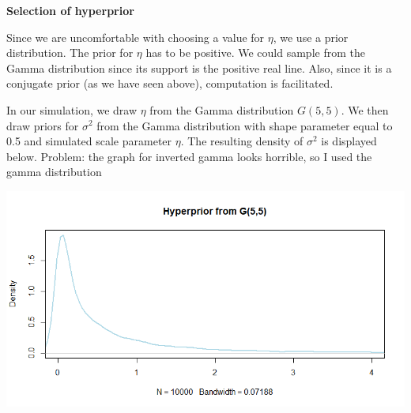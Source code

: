 \documentclass{article}
\begin{document}
\begin{center}
\textbf{Selection of hyperprior}
\end{center}

Since we are uncomfortable with choosing a value for $\eta$, we use a prior distribution. The prior for $\eta$ has to be positive. We could sample from the Gamma distribution since its support is the positive real line. Also, since it is a conjugate prior (as we have seen above), computation is facilitated. 

In our simulation, we draw $\eta$ from the Gamma distribution $G(5,5)$. We then draw priors for $\sigma^{2}$ from the Gamma distribution with shape parameter equal to 0.5 and simulated scale parameter $\eta$. The resulting density of $\sigma^{2}$ is displayed below. Problem: the graph for inverted gamma looks horrible, so I used the gamma distribution


\includegraphics{Figures and Plots/figure-latex/Rplot 43.png}
\end{document}
